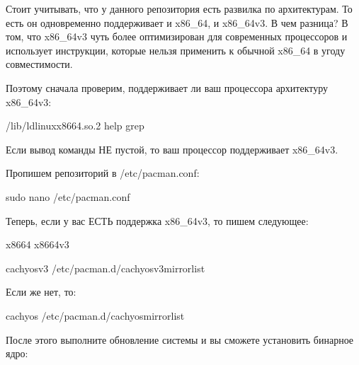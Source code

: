 \documentclass[letterpaper,10pt,russian,openany]{sphinxmanual}
\begin{document}
\sphinxAtStartPar
Стоит учитывать, что у данного репозитория есть развилка по архитектурам. То есть он одновременно
поддерживает и x86\_64, и x86\_64v3. В чем разница? В том, что x86\_64v3 чуть более оптимизирован
для современных процессоров и использует инструкции, которые нельзя применить к обычной x86\_64 в угоду
совместимости.

\sphinxAtStartPar
Поэтому сначала проверим, поддерживает ли ваш процессора архитектуру x86\_64v3:

\begin{sphinxVerbatim}[commandchars=\\\{\}]
/lib/ld\PYGZhy{}linux\PYGZhy{}x86\PYGZhy{}64.so.2 \PYGZhy{}\PYGZhy{}help  grep 
\end{sphinxVerbatim}

\sphinxAtStartPar
Если вывод команды НЕ пустой, то ваш процессор поддерживает x86\_64v3.

\sphinxAtStartPar
Пропишем репозиторий в /etc/pacman.conf:

\begin{sphinxVerbatim}[commandchars=\\\{\}]
sudo nano /etc/pacman.conf
\end{sphinxVerbatim}

\sphinxAtStartPar
Теперь, если у вас ЕСТЬ поддержка x86\_64v3, то пишем следующее:

\begin{sphinxVerbatim}[commandchars=\\\{\}]
  x86\PYGZus{}64 x86\PYGZus{}64\PYGZus{}v3

\PYG{o}{[}cachyos\PYGZhy{}v3\PYG{o}{]}
  /etc/pacman.d/cachyos\PYGZhy{}v3\PYGZhy{}mirrorlist
\end{sphinxVerbatim}

\sphinxAtStartPar
Если же нет, то:

\begin{sphinxVerbatim}[commandchars=\\\{\}]
\PYG{o}{[}cachyos\PYG{o}{]}
  /etc/pacman.d/cachyos\PYGZhy{}mirrorlist
\end{sphinxVerbatim}

\sphinxAtStartPar
После этого выполните обновление системы и вы сможете установить бинарное ядро:
\end{document}
